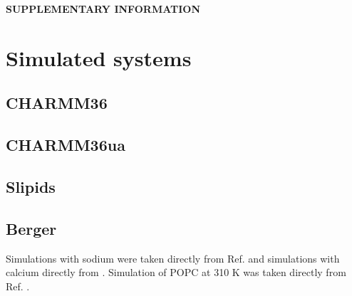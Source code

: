 \documentclass[aps,prl,superscriptaddress,twocolumn]{revtex4}
\begin{document}
%

\begin{acknowledgments}
\end{acknowledgments}
\pagebreak
\appendix
\begin{center}
{\bf SUPPLEMENTARY INFORMATION}
\end{center}

\section{Simulated systems}

\subsection{CHARMM36}

\subsection{CHARMM36ua}

\subsection{Slipids}

\subsection{Berger}
Simulations with sodium were taken directly from Ref.  and
simulations with calcium directly from .
Simulation of POPC at 310 K was taken directly from Ref. .
\end{document}
